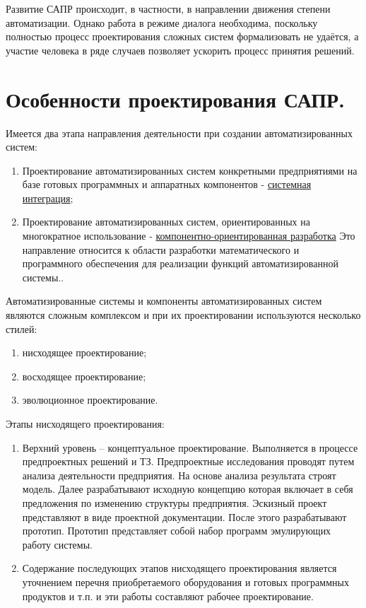 \documentclass[unicode, 12pt, a4paper, oneside]{article}
\begin{document}
Развитие САПР происходит, в частности, в направлении движения степени автоматизации. Однако работа в режиме диалога необходима, поскольку полностью процесс проектирования сложных систем формализовать не удаётся, а участие человека в ряде случаев позволяет ускорить процесс принятия решений.

\section{Особенности проектирования САПР.}

Имеется два этапа направления деятельности при создании автоматизированных систем:

\begin{enumerate}
\item Проектирование автоматизированных систем конкретными предприятиями на базе готовых программных и аппаратных компонентов - \underline{системная интеграция};
\item Проектирование автоматизированных систем, ориентированных на многократное использование - \underline{компонентно-ориентированная разработка} Это направление относится к области разработки математического и программного обеспечения для реализации функций автоматизированной системы..
\end{enumerate}

Автоматизированные системы и компоненты автоматизированных систем являются сложным комплексом и при их проектировании используются несколько стилей:

\begin{enumerate}
\item нисходящее проектирование;
\item восходящее проектирование;
\item эволюционное проектирование.
\end{enumerate}

Этапы нисходящего проектирования:

\begin{enumerate}
\item Верхний уровень – концептуальное проектирование. Выполняется в процессе предпроектных решений и ТЗ. Предпроектные исследования проводят путем анализа деятельности предприятия. На основе анализа результата строят модель. Далее разрабатывают исходную концепцию которая включает в себя предложения по изменению структуры предприятия. Эскизный проект представляют в виде проектной документации. После этого разрабатывают прототип. Прототип представляет собой набор программ эмулирующих работу системы.
\item Содержание последующих этапов нисходящего проектирования является уточнением перечня приобретаемого оборудования и готовых программных продуктов и т.п. и эти работы составляют рабочее проектирование.
\end{enumerate}
\end{document}
